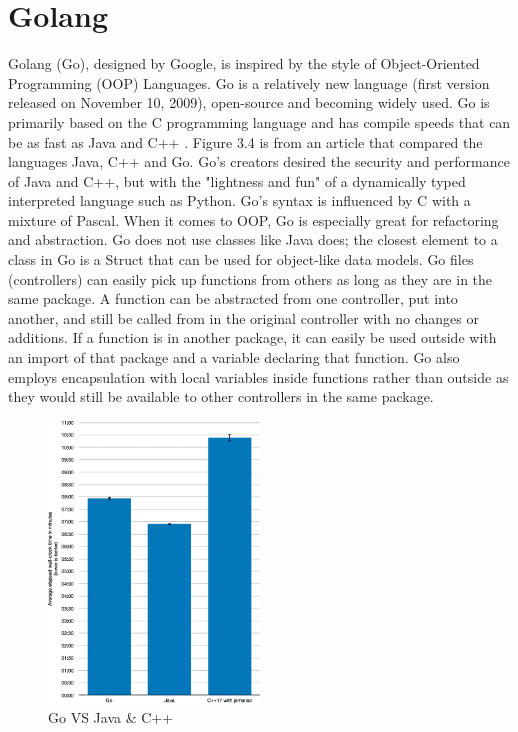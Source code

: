 \section{Golang}
Golang (Go), designed by Google, is inspired by the style of Object-Oriented Programming (OOP) Languages. Go is a relatively new language (first version released on November 10, 2009), open-source and becoming widely used. Go is primarily based on the C programming language and has compile speeds that can be as fast as Java and C++ \cite{ref7}. Figure 3.4 is from an article that compared the languages Java, C++ and Go. Go's creators desired the security and performance of Java and C++, but with the "lightness and fun" of a dynamically typed interpreted language such as Python. Go's syntax is influenced by C with a mixture of Pascal. \cite{ref8}
When it comes to OOP, Go is especially great for refactoring and abstraction. Go does not use classes like Java does; the closest element to a class in Go is a Struct that can be used for object-like data models. \cite{ref9} Go files (controllers) can easily pick up functions from others as long as they are in the same package. A function can be abstracted from one controller, put into another, and still be called from in the original controller with no changes or additions. If a function is in another package, it can easily be used outside with an import of that package and a variable declaring that function. Go also employs encapsulation with local variables inside functions rather than outside as they would still be available to other controllers in the same package.

\begin{figure}[H]
    \caption{Go VS Java \& C++ \cite{ref7}}
    \label{image:goJavaCpp}
    \centering
    \includegraphics[width=0.5\textwidth]{images/misc/go-java-cpp.png}
\end{figure}

